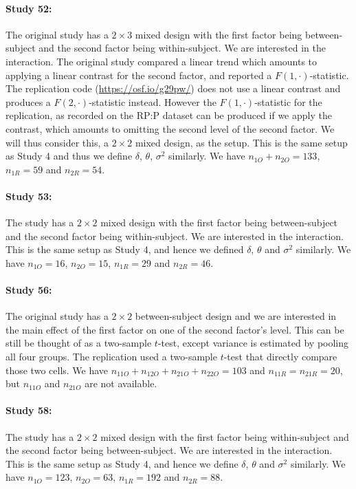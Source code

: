 \documentclass[11pt]{article}
\theoremstyle{definition}
\theoremstyle{custom}
\begin{document}
  \paragraph{Study 52: \citet{Centerbar:2008vx}}
  The original study has a $2 \times 3$ mixed design with the first factor being between-subject and the second factor being within-subject. We are interested in the interaction. The original study compared a linear trend which amounts to applying a linear contrast for the second factor, and reported a $F(1, \cdot)$-statistic. The replication code (\url{https://osf.io/g29pw/}) does not use a linear contrast and produces a $F(2, \cdot)$-statistic instead. However the $F(1, \cdot)$-statistic for the replication, as recorded on the RP:P dataset can be produced if we apply the contrast, which amounts to omitting the second level of the second factor. We will thus consider this, a $2 \times 2$ mixed design, as the setup. This is the same setup as Study 4 and thus we define $\delta$, $\theta$, $\sigma^2$ similarly. We have $n_{1O} + n_{2O} = 133$, $n_{1R} = 59$ and $n_{2R} = 54$.

  \paragraph{Study 53: \citet{Amodio:2008fx}}
  The study has a $2 \times 2$ mixed design with the first factor being between-subject and the second factor being within-subject. We are interested in the interaction. This is the same setup as Study 4, and hence we defined $\delta$, $\theta$ and $\sigma^2$ similarly. We have $n_{1O} = 16$, $n_{2O} = 15$, $n_{1R} = 29$ and $n_{2R} = 46$.

  \paragraph{Study 56: \citet{vanDijk:2008br}}
  The original study has a $2 \times 2$ between-subject design and we are interested in the main effect of the first factor on one of the second factor's level. This can be still be thought of as a two-sample $t$-test, except variance is estimated by pooling all four groups. The replication used a two-sample $t$-test that directly compare those two cells. We have $n_{11O} + n_{12O} + n_{21O} + n_{22O} = 103$ and $n_{11R} = n_{21R} = 20$, but $n_{11O}$ and $n_{21O}$ are not available.

  \paragraph{Study 58: \citet{Lemay:2008jb}}
  The study has a $2 \times 2$ mixed design with the first factor being within-subject and the second factor being between-subject. We are interested in the interaction. This is the same setup as Study 4, and hence we define $\delta$, $\theta$ and $\sigma^2$ similarly. We have $n_{1O} = 123$, $n_{2O} = 63$, $n_{1R} = 192$ and $n_{2R} = 88$.
\end{document}
